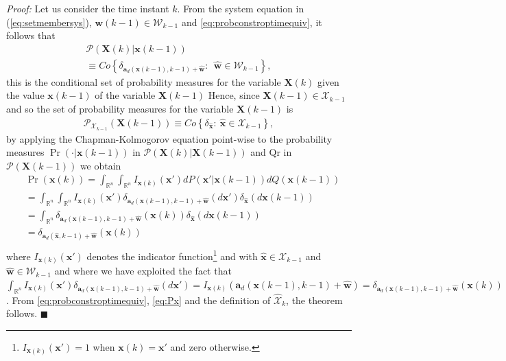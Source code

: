 \documentclass[twocolumn]{autart}
\newenvironment*{proof}{\emph{Proof:}}{}
\newcommand*{\qued}{\hfill\ensuremath{\blacksquare}}
\begin{document}
\begin{proof}
Let us consider the time instant $k$.  From the system equation in (\ref{eq:setmembersys}), $\mathbf{w}(k-1) \in \mathcal{W}_{k-1}$ and \eqref{eq:probconstroptimequiv}, it follows that
 $$
\begin{array}{l}
\mathcal{P}(\mathbf{X}(k)|\mathbf{x}(k-1))\\
\equiv Co\left\{\delta_{\mathbf{a}_d(\mathbf{x}(k-1),k-1)+\mathbf{\hat{w}}}:~~\mathbf{\hat{w}} \in \mathcal{W}_{k-1}\right\},\end{array}
 $$
 this is the conditional set of probability measures for the variable $\mathbf{X}(k)$ given the value $\mathbf{x}(k-1)$ of the variable
 $\mathbf{X}(k-1)$
Hence, since $\mathbf{X}(k-1) \in \mathcal{X}_{k-1}$ and so the set of probability measures for the variable $\mathbf{X}(k-1)$ is
$$
\begin{array}{l}
\mathcal{P}_{\mathcal{X}_{k-1}}(\mathbf{X}(k-1))\equiv Co\left\{\delta_{\hat{\mathbf{x}}}:~\hat{\mathbf{x}}\in  \mathcal{X}_{k-1}\right\},
 \end{array}
$$
  by applying the Chapman-Kolmogorov equation point-wise to the probability measures  $\Pr(\cdot|\mathbf{x}(k-1))$ in $\mathcal{P}(\mathbf{X}(k)|\mathbf{X}(k-1))$ and  $\text{Qr}$    in $\mathcal{P}(\mathbf{X}(k-1))$
  we obtain
 \begin{align} \label{eq:Px}
 \nonumber
  &\Pr(\mathbf{x}(k))=\int_{\mathbb{R}^n} \int_{\mathbb{R}^n} I_{\mathbf{x}(k)}(\mathbf{x}') dP(\mathbf{x}'|\mathbf{x}(k-1))dQ(\mathbf{x}(k-1))\\
 \nonumber
 &=\int_{\mathbb{R}^n} \int_{\mathbb{R}^n} I_{\mathbf{x}(k)}(\mathbf{x}')  \delta_{\mathbf{a}_d(\mathbf{x}(k-1),k-1)+\mathbf{\hat{w}}}(d\mathbf{x}') \delta_{\hat{\mathbf{x}}}(d\mathbf{x}(k-1))\\
  \nonumber
  &=\int_{\mathbb{R}^n} \delta_{\mathbf{a}_d(\mathbf{x}(k-1),k-1)+\mathbf{\hat{w}}}(\mathbf{x}(k)) \delta_{\hat{\mathbf{x}}}(d\mathbf{x}(k-1))\\
  \nonumber
  &=\delta_{\mathbf{a}_d(\hat{\mathbf{x}},k-1)+\mathbf{\hat{w}}}(\mathbf{x}(k))\\
  \end{align}
   where $I_{\mathbf{x}(k)}(\mathbf{x}')$ denotes the indicator function\footnote{$I_{\mathbf{x}(k)}(\mathbf{x}')=1$ when $\mathbf{x}(k)=\mathbf{x}'$ and zero otherwise.}   and with $\hat{\mathbf{x}} \in \mathcal{X}_{k-1}$ and $\mathbf{\hat{w}} \in \mathcal{W}_{k-1}$ and where we have exploited the fact that
   $ \int_{\mathbb{R}^n} I_{\mathbf{x}(k)}(\mathbf{x}')  \delta_{\mathbf{a}_d(\mathbf{x}(k-1),k-1)+\mathbf{\hat{w}}}(d\mathbf{x}')=I_{\mathbf{x}(k)}(\mathbf{a}_d(\mathbf{x}(k-1),k-1)+\mathbf{\hat{w}})=\delta_{\mathbf{a}_d(\mathbf{x}(k-1),k-1)+\mathbf{\hat{w}}}(\mathbf{x}(k))$.
     From \eqref{eq:probconstroptimequiv}, \eqref{eq:Px} and the definition of ${\hat{\mathcal{X}}_k}$, the theorem follows. \qued\\
   \end{proof}
\end{document}
